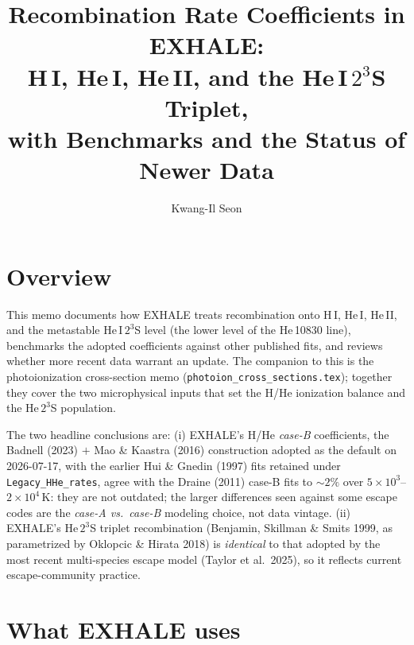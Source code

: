 \documentclass[english,a4paper]{my_memo}
\begin{document}
\title{Recombination Rate Coefficients in EXHALE:\\
H\,I, He\,I, He\,II, and the He\,I\,$2^3$S Triplet,\\
with Benchmarks and the Status of Newer Data}
\author{Kwang-Il Seon}
\date{\docmoddate}
\maketitle

\tableofcontents
\bigskip

\section{Overview}

This memo documents how EXHALE treats recombination onto H\,I, He\,I,
He\,II, and the metastable He\,I\,$2^3$S level (the lower level of the
He\,10830 line), benchmarks the adopted coefficients against other
published fits, and reviews whether more recent data warrant an update.
The companion to this is the photoionization cross-section memo
(\texttt{photoion\_cross\_sections.tex}); together they cover the two
microphysical inputs that set the H/He ionization balance and the
He\,$2^3$S population.

The two headline conclusions are: (i) EXHALE's H/He \emph{case-B}
coefficients, the Badnell (2023) $+$ Mao \& Kaastra (2016) construction
adopted as the default on 2026-07-17, with the earlier Hui \& Gnedin (1997)
fits retained under \texttt{Legacy\_HHe\_rates}, agree with the Draine (2011)
case-B fits to $\sim$$2\%$ over $5\times10^3$--$2\times10^4\,$K: they are not
outdated; the larger differences seen against some escape codes are the
\emph{case-A vs.\ case-B} modeling choice, not data vintage. (ii) EXHALE's
He\,$2^3$S triplet recombination (Benjamin, Skillman \& Smits 1999, as
parametrized by Oklopcic \& Hirata 2018) is \emph{identical} to that
adopted by the most recent multi-species escape model (Taylor et al.\
2025), so it reflects current escape-community practice.

\section{What EXHALE uses}\label{sec:exhale}
\end{document}
